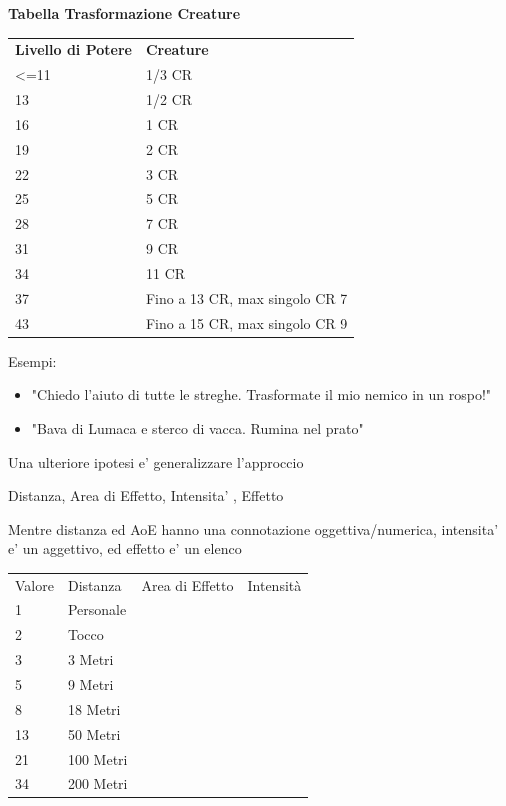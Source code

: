 \documentclass[a4paper,10 pt,twoside,openany]{book}
\begin{document}
\bigskip

\textbf{Tabella Trasformazione Creature}
\medskip

\begin{tabularx}{0.95\textwidth}{lX}
	\toprule
	\textbf{Livello di Potere} & \textbf{Creature}\\
	<=11	& 1/3 CR    \\
	13		& 1/2 CR   \\
	16		& 1 CR \\
	19		& 2 CR \\
	22		& 3 CR \\
	25		& 5 CR \\
	28		& 7 CR \\
	31		& 9 CR \\
	34		& 11 CR\\
	37		& Fino a 13 CR, max singolo CR 7\\
	43		& Fino a 15 CR, max singolo CR 9\\
\end{tabularx}

\bigskip


Esempi:
\begin{itemize}
	\item
	"Chiedo l'aiuto di tutte le streghe. Trasformate il mio nemico in un rospo!"
	\item
	"Bava di Lumaca e sterco di vacca. Rumina nel prato"
\end{itemize}

\pagebreak



\pagebreak

{\scriptsize
	\printindex}

Una ulteriore ipotesi e' generalizzare l'approccio

Distanza, Area di Effetto, Intensita' , Effetto

Mentre distanza ed AoE hanno una connotazione oggettiva/numerica, intensita' e' un aggettivo, ed effetto e' un elenco




\begin{tabularx}{0.95\textwidth}{llll}
	\toprule
Valore & Distanza		& Area di Effetto & Intensità 	\\
1		&	Personale	& 	&\\
2		&	Tocco		&	&\\
3		&	3 Metri		&	&\\
5		&	9 Metri		&	&\\
8		&	18 Metri	&	&\\
13		&	50 Metri	&	&\\
21		&	100 Metri	&	&\\
34		&	200 Metri	&	&\\
\end{tabularx}
\end{document}
